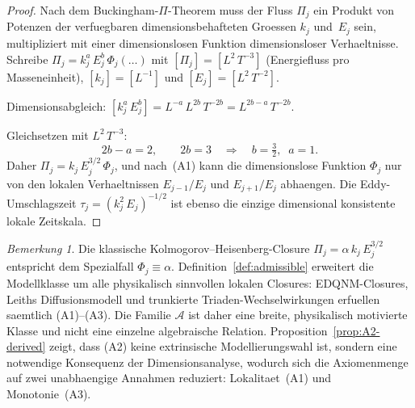 \documentclass[12pt,a4paper]{article}
\theoremstyle{definition}
\theoremstyle{plain}
\theoremstyle{remark}
\newtheorem{remark}[definition]{Bemerkung}
\begin{document}
\begin{proof}
Nach dem Buckingham-$\Pi$-Theorem muss der Fluss $\Pi_j$ ein Produkt von Potenzen der verfuegbaren dimensionsbehafteten Groessen $k_j$ und~$E_j$ sein, multipliziert mit einer dimensionslosen Funktion dimensionsloser Verhaeltnisse. Schreibe $\Pi_j = k_j^{a}\,E_j^{b}\,\Phi_j(\ldots)$ mit $[\Pi_j] = [L^2\,T^{-3}]$ (Energiefluss pro Masseneinheit), $[k_j] = [L^{-1}]$ und $[E_j] = [L^2\,T^{-2}]$.

Dimensionsabgleich: $[k_j^a\,E_j^b] = L^{-a}\,L^{2b}\,T^{-2b} = L^{2b-a}\,T^{-2b}$.

Gleichsetzen mit $L^2\,T^{-3}$:
\[
2b - a = 2, \qquad 2b = 3 \quad\Longrightarrow\quad b = \tfrac{3}{2},\;\; a = 1.
\]
Daher $\Pi_j = k_j\,E_j^{3/2}\,\Phi_j$, und nach~(A1) kann die dimensionslose Funktion $\Phi_j$ nur von den lokalen Verhaeltnissen $E_{j-1}/E_j$ und $E_{j+1}/E_j$ abhaengen. Die Eddy-Umschlagszeit $\tau_j = (k_j^2\,E_j)^{-1/2}$ ist ebenso die einzige dimensional konsistente lokale Zeitskala.
\end{proof}

\begin{remark}
Die klassische Kolmogorov--Heisenberg-Closure $\Pi_j = \alpha\,k_j\,E_j^{3/2}$
entspricht dem Spezialfall $\Phi_j \equiv \alpha$. Definition~\ref{def:admissible}
erweitert die Modellklasse um alle physikalisch sinnvollen lokalen Closures:
EDQNM-Closures, Leiths Diffusionsmodell und trunkierte Triaden-Wechselwirkungen
erfuellen saemtlich (A1)--(A3). Die Familie $\mathscr{A}$ ist daher eine breite,
physikalisch motivierte Klasse und nicht eine einzelne algebraische Relation.
Proposition~\ref{prop:A2-derived} zeigt, dass (A2) keine extrinsische
Modellierungswahl ist, sondern eine notwendige Konsequenz der Dimensionsanalyse,
wodurch sich die Axiomenmenge auf zwei unabhaengige Annahmen reduziert:
Lokalitaet~(A1) und Monotonie~(A3).
\end{remark}
\end{document}
